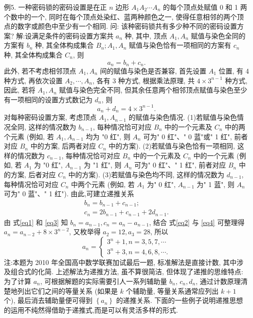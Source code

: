 例5. 一种密码锁的密码设置是在正 $n$ 边形 $A_1 A_2 \cdots A_n$ 的每个顶点处赋值 0 和 1 两个数中的一个, 同时在每个顶点处染红、蓝两种颜色之一, 使得任意相邻的两个顶点的数字或颜色中至少有一个相同.
问: 该种密码锁共有多少种不同的密码设置方案?
解:设满足条件的密码设置方案共 $a_n$ 种, 其中, 顶点 $A_1, A_n$ 赋值与染色全同的方案有 $b_n$ 种, 其全体构成集合 $B_n ; A_1, A_n$ 赋值与染色恰有一项相同的方案有 $c_n$ 种, 其全体构成集合 $C_n$, 则
$$
a_n=b_n+c_n . \label{eq1}
$$
此外, 若不考虑相邻顶点 $A_1, A_n$ 间的赋值与染色是否兼容, 首先设置 $A_1$ 位置, 有 4 种方式, 再依次设置 $A_2, \cdots, A_n$, 各有 3 种方式, 根据乘法原理, 共 $4 \times 3^{n-1}$ 种方式, 因此, 若将 $A_1, A_n$ 赋值与染色完全不同, 但其余任意两个相邻顶点赋值与染色至少有一项相同的设置方式数记为 $d_n$, 则
$$
a_n+d_n=4 \times 3^{n-1} . \label{eq2}
$$
对每种密码设置方案, 考虑顶点 $A_1, A_{n-1}$ 的赋值与染色情况.
(1)若赋值与染色情况全同, 这样的情况数为 $b_{n-1}$, 每种情况恰可对应 $B_n$ 中的一个元素及 $C_n$ 中的两个元素 (例如, 若 $A_1, A_{n-1}$ 均为 "0 红", 则 $A_n$ 可为" 0 红"、" 0 蓝"或" 1 红", 前者对应 $B_n$ 中的方案, 后两者对应 $C_n$ 中的方案).
(2)若赋值与染色恰有一项相同, 这样的情况数为 $c_{n-1}$, 每种情况恰可对应 $B_n$ 中的一个元素及 $C_n$ 中的一个元素 (例如, 若 $A_1$ 为 "0 红", $A_{n-1}$ 为 "1 红", 则 $A_n$ 可为" 0 红"、" 1 红", 前者对应 $B_n$ 中的方案, 后者对应 $C_n$ 中的方案).
(3)若赋值与染色均不同, 这样的情况数为 $d_{n-1}$, 每种情况恰可对应 $C_n$
中两个元素 (例如, 若 $A_1$ 为" 0 红", $A_{n-1}$ 为" 1 蓝", 则 $A_n$ 可为" 0 蓝"、" 1 红").
由此,可建立递推关系
$$
\begin{gathered}
b_n=b_{n-1}+c_{n-1} ; \label{eq3} \\
c_n=2 b_{n-1}+c_{n-1}+2 d_{n-1} . \label{eq4}
\end{gathered}
$$
由 式\ref{eq1} 和 \ref{eq3} 知 $b_n=a_{n-1}, c_n=a_n-a_{n-1}$, 结合 式\ref{eq2} 与 \ref{eq4} 可整理得 $a_n=a_{n-2}+ 8 \times 3^{n-2}$, 又枚举得 $a_2=12, a_3=28$, 所以
$$
a_n=\left\{\begin{array}{l}
3^n+1, n=3,5,7, \cdots \\
3^n+3, n=4,6,8, \cdots .
\end{array}\right.
$$
注:本题为 2010 年全国高中数学联赛加试最后一题, 标准解法是直接计数, 其中涉及组合式的化简.
上述解法为递推方法, 虽不算很简洁, 但体现了递推的思维特点: 为了计算 $a_n$, 可根据解题的实际需要引人一系列辅助量 $b_n$, $c_n, d_n$, 通过计数原理清楚地列出它们之间的等量关系 (如果是 $k$ 个辅助量, 等量关系通常应列出 $k+1$ 个), 最后消去辅助量便可得到 $\left\{a_n\right\}$ 的递推关系.
下面的一些例子说明递推思想的运用不纯然得借助于递推式,而是可以有灵活多样的形式.




